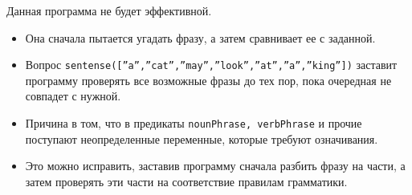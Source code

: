 \begin{frame}

	\frametitle{\insertsection}
	\framesubtitle{\insertsubsection}
	
	Данная программа не будет эффективной.
	
	\begin{itemize}
		\item Она сначала пытается угадать фразу, а затем сравнивает ее с заданной.
		\item Вопрос \texttt{sentense([''a'',''cat'',''may'',''look'',''at'',''a'',''king''])} заставит программу проверять все возможные фразы до тех пор, пока очередная
		не совпадет с нужной.
		\item Причина в том, что в предикаты \texttt{nounPhrase, verbPhrase} и прочие поступают неопределенные переменные, которые требуют означивания.
		\item Это можно исправить, заставив программу сначала разбить фразу на части, а затем проверять эти части на соответствие правилам грамматики.
	\end{itemize}
	
	
\end{frame}



